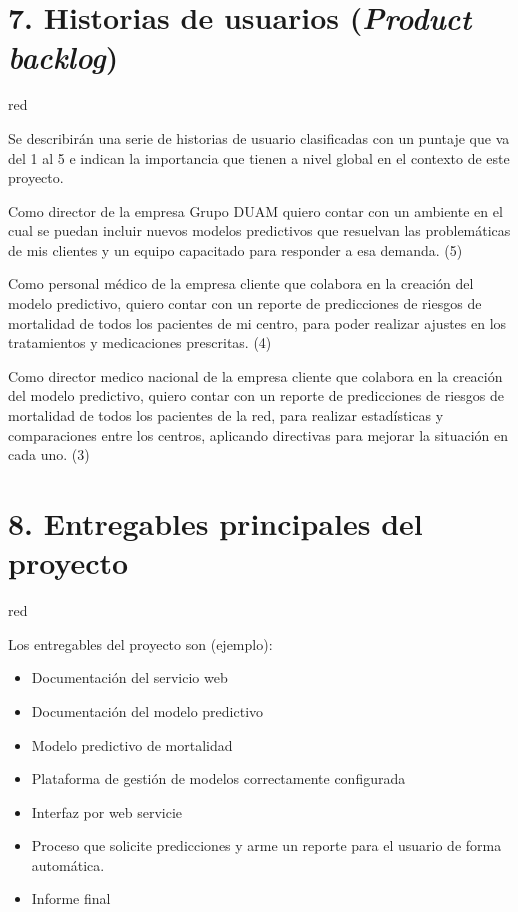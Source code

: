 \documentclass[
11pt, %
]{charter}
\begin{document}
\section{7. Historias de usuarios (\textit{Product backlog})}
\label{sec:backlog}

\begin{consigna}{red}

Se describirán una serie de historias de usuario clasificadas con un puntaje que va del 1 al 5 e indican la importancia que tienen a nivel global en el contexto de este proyecto.

Como director de la empresa Grupo DUAM quiero contar con un ambiente en el cual se puedan incluir nuevos modelos predictivos que resuelvan las problemáticas de mis clientes y un equipo capacitado para responder a esa demanda. (5)

Como personal médico de la empresa cliente que colabora en la creación del modelo predictivo, quiero contar con un reporte de predicciones de riesgos de mortalidad de todos los pacientes de mi centro, para poder realizar ajustes en los tratamientos y medicaciones prescritas. (4)

Como director medico nacional de la empresa cliente que colabora en la creación del modelo predictivo, quiero contar con un reporte de predicciones de riesgos de mortalidad de todos los pacientes de la red, para realizar estadísticas y comparaciones entre los centros, aplicando directivas para mejorar la situación en cada uno. (3)

\end{consigna}

\section{8. Entregables principales del proyecto}
\label{sec:entregables}

\begin{consigna}{red}

Los entregables del proyecto son (ejemplo):

\begin{itemize}
	\item Documentación del servicio web
	\item Documentación del modelo predictivo 
	\item Modelo predictivo de mortalidad
	\item Plataforma de gestión de modelos correctamente configurada
	\item Interfaz por web servicie	
	\item Proceso que solicite predicciones y arme un reporte para el usuario de forma automática.
	\item Informe final
\end{itemize}

\end{consigna}
\end{document}
